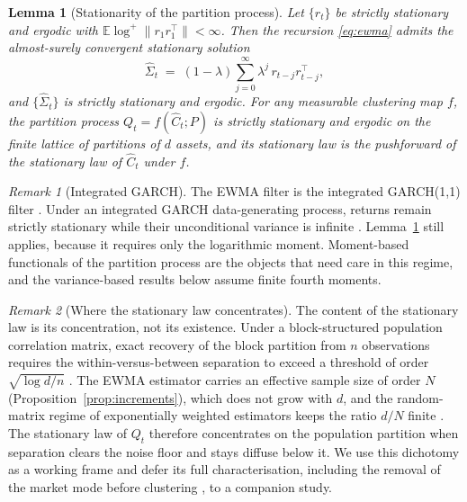 \documentclass{rQUF2e}
\theoremstyle{plain}
\newtheorem{lemma}{Lemma}
\theoremstyle{remark}
\newtheorem{remark}{Remark}
\newcommand{\E}{\mathbb{E}}
\begin{document}
\begin{lemma}[Stationarity of the partition process]
\label{lem:stationarity}
Let $\{r_t\}$ be strictly stationary and ergodic with
$\E \log^{+} \| r_1 r_1^{\top} \| < \infty$. Then the recursion
\eqref{eq:ewma} admits the almost-surely convergent stationary solution
\begin{equation}
\widehat{\Sigma}_t \;=\; (1-\lambda) \sum_{j=0}^{\infty} \lambda^{j}\,
r_{t-j} r_{t-j}^{\top},
\label{eq:stationarysol}
\end{equation}
and $\{\widehat{\Sigma}_t\}$ is strictly stationary and ergodic. For any
measurable clustering map $f$, the partition process
$Q_t = f(\widehat{C}_t; P)$ is strictly stationary and ergodic on the finite
lattice of partitions of $d$ assets, and its stationary law is the pushforward
of the stationary law of $\widehat{C}_t$ under $f$.
\end{lemma}

\begin{remark}[Integrated GARCH]
\label{rem:igarch}
The EWMA filter is the integrated GARCH(1,1) filter \citep{riskmetrics1996}.
Under an integrated GARCH data-generating process, returns remain strictly
stationary while their unconditional variance is infinite
\citep{nelson1990stationarity}. Lemma~\ref{lem:stationarity} still applies,
because it requires only the logarithmic moment. Moment-based functionals of
the partition process are the objects that need care in this regime, and the
variance-based results below assume finite fourth moments.
\end{remark}

\begin{remark}[Where the stationary law concentrates]
\label{rem:concentration}
The content of the stationary law is its concentration, not its existence.
Under a block-structured population correlation matrix, exact recovery of the
block partition from $n$ observations requires the within-versus-between
separation to exceed a threshold of order $\sqrt{\log d / n}$
\citep{bunea2020model}. The EWMA estimator carries an effective sample size of
order $N$ (Proposition~\ref{prop:increments}), which does not grow with $d$,
and the random-matrix regime of exponentially weighted estimators keeps the
ratio $d/N$ finite \citep{pafka2004exponential}. The stationary law of $Q_t$
therefore concentrates on the population partition when separation clears the
noise floor and stays diffuse below it. We use this dichotomy as a working
frame and defer its full characterisation, including the removal of the market
mode before clustering \citep{laloux1999noise, lopezdeprado2020machine}, to a
companion study.
\end{remark}
\end{document}
